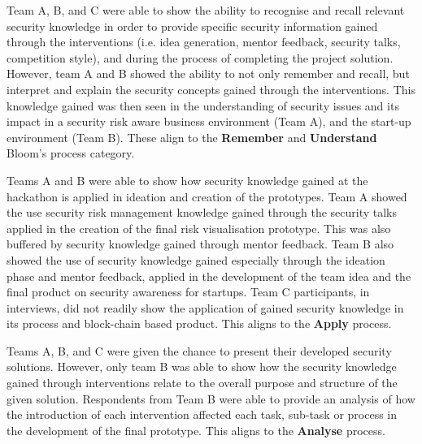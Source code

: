 \documentclass[runningheads]{llncs}
\begin{document}
Team A, B, and C were able to show the ability to recognise and recall relevant security knowledge in order to provide specific security information gained through the interventions (i.e. idea generation, mentor feedback, security talks, competition style), and during the process of completing the project solution. However, team A and B showed the ability to not only remember and recall, but interpret and explain the security concepts gained through the interventions. This knowledge gained was then seen in the understanding of security issues and its impact in a security risk aware business environment (Team A), and the start-up environment (Team B). These align to the \textbf{Remember} and \textbf{Understand} Bloom's process category. %
    
Teams A and B were able to show how security knowledge gained at the hackathon is applied in ideation and creation of the prototypes. Team A showed the use security risk management knowledge gained through the security talks applied in the creation of the final risk visualisation prototype. This was also buffered by security knowledge gained through mentor feedback. Team B also showed the use of security knowledge gained especially through the ideation phase and mentor feedback, applied in the development of the team idea and the final product on security awareness for startups. Team C participants, in interviews, did not readily show the application of gained security knowledge in its process and block-chain based product. This aligns to the \textbf{Apply} process.

Teams A, B, and C were given the chance to present their developed security solutions. However, only team B was able to show how the security knowledge gained through interventions relate to the overall purpose and structure of the given solution. Respondents from Team B were able to provide an analysis of how the introduction of each intervention affected each task, sub-task or process in the development of the final prototype. This aligns to the \textbf{Analyse} process.
\end{document}
